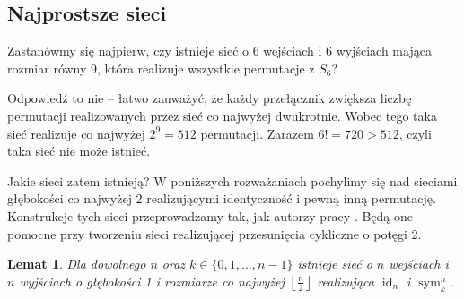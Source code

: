 \documentclass[a4paper]{article}
\newcommand{\sym}[2]{\operatorname{sym}_{#2}^{#1}}
\newcommand{\id}[1]{\operatorname{id}_{#1}}
\newcommand{\floor}[1]{\left\lfloor #1 \right\rfloor}
\newtheorem{lem}[tw]{Lemat}
\theoremstyle{definition}
\begin{document}
\begin{center}
\end{center}

\subsection{Najprostsze sieci}

Zastanówmy się najpierw, czy istnieje sieć o 6 wejściach i 6 wyjściach mająca rozmiar równy 9, która realizuje wszystkie permutacje z \(S_6\)?

\vspace{1em}

Odpowiedź to nie -- łatwo zauważyć, że każdy przełącznik zwiększa liczbę permutacji realizowanych przez sieć co najwyżej dwukrotnie. Wobec tego taka sieć realizuje co najwyżej \(2^9 = 512\) permutacji. Zarazem \(6! = 720 > 512\),  czyli taka sieć nie może istnieć. 

\vspace{1em}

Jakie sieci zatem istnieją? W poniższych rozważaniach pochylimy się nad sieciami głębokości co najwyżej 2 realizującymi identyczność i pewną inną permutację. Konstrukcje tych sieci przeprowadzamy tak, jak autorzy pracy \cite{klo}. Będą one pomocne przy tworzeniu sieci realizującej przesunięcia cykliczne o potęgi 2. 

\begin{lem}\label{lem:perm_symetrie}
    Dla dowolnego \(n\) oraz \(k \in \{0, 1, \ldots, n-1\}\) istnieje sieć o \(n\) wejściach i \(n\) wyjściach o głębokości 1 i rozmiarze co najwyżej \(\floor{\frac n 2}\) realizująca \(\id{n}\) i \(\sym{n}{k}\).
\end{lem}
\end{document}
